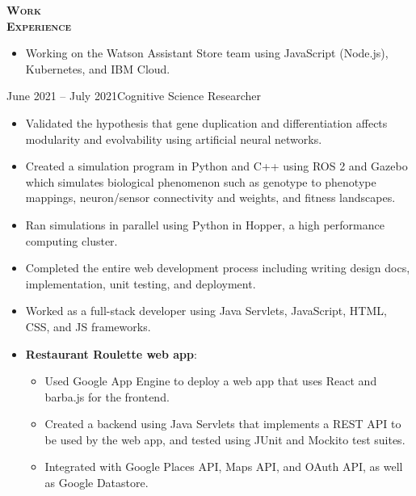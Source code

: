 \documentclass[12pt]{article}
\begin{document}
\begin{minipage}[t]{0.15\textwidth}\vspace{-0.5em}%
    {\color{Red} \textbf{\textsc{Work\\Experience}}}
\end{minipage}
\hfill
\begin{minipage}[t]{0.82\textwidth}\vspace{-0.5em}%
    \begin{itemize}
        \item Working on the Watson Assistant Store team using JavaScript
              (Node.js), Kubernetes, and IBM Cloud.
    \end{itemize}
    \vspace{0.5em}
                  {June 2021 -- July 2021}{Cognitive Science Researcher}
    \begin{itemize}
        \item Validated the hypothesis that gene duplication and
              differentiation affects modularity and evolvability using
              artificial neural networks.
        \item Created a simulation program in Python and C++ using ROS 2 and
              Gazebo which
              simulates biological phenomenon such as genotype to phenotype
              mappings, neuron/sensor connectivity and weights, and fitness
              landscapes.
        \item Ran simulations in parallel using Python in Hopper, a high
              performance computing cluster.
    \end{itemize}
    \vspace{0.5em}
    \begin{itemize}
        \item Completed the entire web development process including writing
              design docs, implementation, unit testing, and deployment.
        \item Worked as a full-stack developer using Java Servlets, JavaScript,
              HTML, CSS, and JS frameworks.
        \item \textbf{Restaurant Roulette web app}:
        \begin{itemize}
            \item Used Google App Engine to deploy a web app that uses React
                  and barba.js for the frontend.
            \item Created a backend using Java Servlets that implements a
                  REST API to be used by the web app, and tested using JUnit
                  and Mockito test suites.
            \item Integrated with Google Places API, Maps API, and OAuth API,
                  as well as Google Datastore.
        \end{itemize}
    \end{itemize}
\end{minipage}
\end{document}
